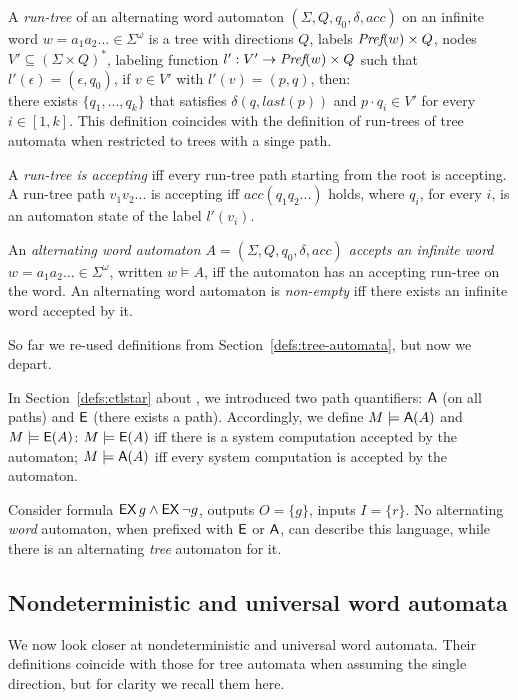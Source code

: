 A \emph{run-tree} of an alternating word automaton
$(\Sigma, Q, q_0, \delta, acc)$
on an infinite word $w = a_1 a_2 ... \in \Sigma^\omega$
is a tree
with directions $Q$,
labels $\textit{Pref}(w) \times Q$,
nodes $V' \subseteq (\Sigma \times Q)^*$,
labeling function $l': V' \to \textit{Pref}(w) \times Q$
such that
\li
\- $l'(\epsilon) = (\epsilon, q_0)$,
\- if $v \in V'$ with $l'(v) = (p,q)$, then:\\
   there exists $\{q_1,...,q_k\}$ that satisfies $\delta(q, last(p))$
   and $p \cdot q_i \in V'$ for every $i \in [1,k]$.
\il
This definition coincides with the definition of run-trees of tree automata
when restricted to trees with a singe path.

A \emph{run-tree is accepting}
iff every run-tree path starting from the root is accepting.
A run-tree path $v_1 v_2 ...$ is accepting
iff $acc(q_1 q_2 ...)$ holds,
where $q_i$, for every $i$, is an automaton state of the label $l'(v_i)$.

An \emph{alternating word automaton $A=(\Sigma, Q, q_0, \delta, acc)$
accepts an infinite word $w=a_1 a_2... \in \Sigma^\omega$},
written $w \models A$,
iff
the automaton has an accepting run-tree on the word.
An alternating word automaton is \emph{non-empty}
iff there exists an infinite word accepted by it.

So far we re-used definitions from Section~\ref{defs:tree-automata},
but now we depart.

In Section~\ref{defs:ctlstar} about \CTLstar, we introduced two path quantifiers:
${\operatorname{\mathsf{A}}}$ (on all paths) and ${\operatorname{\mathsf{E}}}$ (there exists a path).
Accordingly, we define $M\models {\ensuremath{\operatorname{\mathsf{A}}}}(A)$ and $M \models {\ensuremath{\operatorname{\mathsf{E}}}}(A)$:
$M \models {\ensuremath{\operatorname{\mathsf{E}}}}(A)$ iff there is a system computation accepted by the automaton;
$M \models {\ensuremath{\operatorname{\mathsf{A}}}}(A)$ iff every system computation is accepted by the automaton.

\begin{remark}
Consider \CTLstar formula $\operatorname{\mathsf{EX}} g \land \operatorname{\mathsf{EX}} \neg g$,
outputs $O = \{g\}$, inputs $I = \{r\}$.
No alternating \emph{word} automaton, when prefixed with ${\operatorname{\mathsf{E}}}$ or ${\operatorname{\mathsf{A}}}$,
can describe this language,
while there is an alternating \emph{tree} automaton for it.
\end{remark}

\subsection*{Nondeterministic and universal word automata}

We now look closer at nondeterministic and universal word automata.
Their definitions coincide
with those for tree automata when assuming the single direction,
but for clarity we recall them here.

